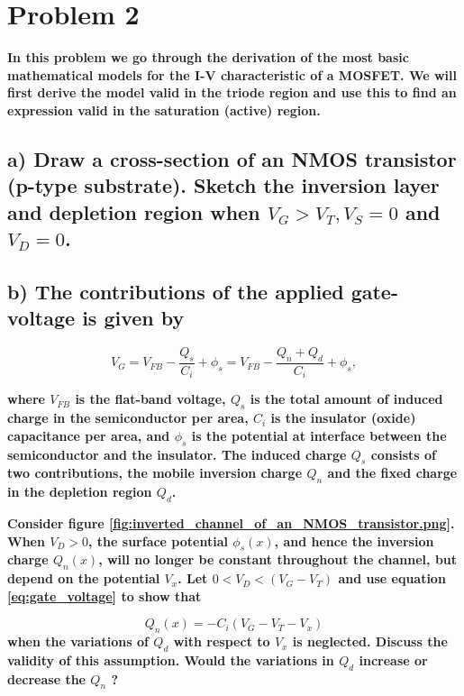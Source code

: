 \section{Problem 2}
\textbf{In this problem we go through the derivation of the most basic mathematical models for the I-V characteristic of a MOSFET. We will first derive the model valid in the triode region and use this to find an expression valid in the saturation (active) region.}
\subsection*{a) Draw a cross-section of an NMOS transistor (p-type substrate). Sketch the inversion layer and depletion region when $V_G>V_T, V_S=0$ and $V_D=0$.}

\subsection*{b) The contributions of the applied gate-voltage is given by}
\begin{equation}
    V_G=V_{F B}-\frac{Q_s}{C_i}+\phi_s=V_{F B}-\frac{Q_n+Q_d}{C_i}+\phi_s,
    \label{eq:gate_voltage}    
\end{equation}

\textbf{where $V_{F B}$ is the flat-band voltage, $Q_s$ is the total amount of induced charge in the semiconductor per area, $C_i$ is the insulator (oxide) capacitance per area, and $\phi_s$ is the potential at interface between the semiconductor and the insulator. The induced charge $Q_s$ consists of two contributions, the mobile inversion charge $Q_n$ and the fixed charge in the depletion region $Q_d$.}

\textbf{Consider figure \ref{fig:inverted_channel_of_an_NMOS_transistor.png}. When $V_D>0$, the surface potential $\phi_s(x)$, and hence the inversion charge $Q_n(x)$, will no longer be constant throughout the channel, but depend on the potential $V_x$. Let $0<V_D<\left(V_G-V_T\right)$ and use equation \ref{eq:gate_voltage} to show that}


\begin{equation}
    Q_n(x)=-C_i\left(V_G-V_T-V_x\right)
    \label{eq:chargesomething}
\end{equation}
\textbf{when the variations of $Q_d$ with respect to $V_x$ is neglected. Discuss the validity of this assumption. Would the variations in $Q_d$ increase or decrease the $Q_n$ ?}

